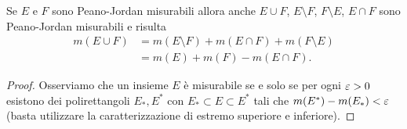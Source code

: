 \begin{theorem}
Se $E$ e $F$ sono Peano-Jordan misurabili allora anche
$E\cup F$, $E\setminus F$, $F\setminus E$, $E\cap F$
sono Peano-Jordan misurabili e risulta
\begin{align*}
  m(E\cup F)
  &= m(E\setminus F) + m(E\cap F) + m(F\setminus E)\\
  &= m(E) + m(F) - m(E\cap F).
\end{align*}
\end{theorem}
%
\begin{proof}
Osserviamo che un insieme $E$ è misurabile se e solo se
per ogni $\varepsilon>0$ esistono dei polirettangoli $E_*, E^*$
con $E_* \subset E \subset E^*$ tali che $m(E^*)-m(E_*)<\varepsilon$
(basta utilizzare la caratterizzazione di estremo superiore e inferiore).


\end{proof}
